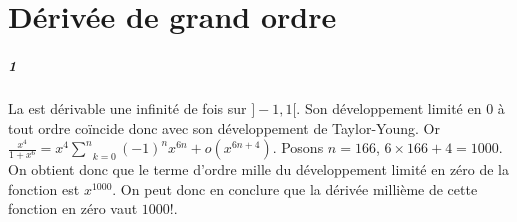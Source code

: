 \documentclass[10pt,a4paper]{article}
\newcommand{\summ}[2]{\underset{#1}{\overset{#2}{\sum}}}
\begin{document}
\section{Dérivée de grand ordre}
\subparagraph{1}La est dérivable une infinité de fois sur $]-1,1[$. Son développement limité en $0$ à tout ordre coïncide donc avec son développement de Taylor-Young. Or $\frac{x^4}{1+x^6} = x^4\summ{k=0}{n}(-1)^{n}x^{6n} + o(x^{6n+4})$. Posons $n=166$, $6 \times 166 +4 = 1000$. On obtient donc que le terme d'ordre mille du développement limité en zéro de la fonction est $x^1000$. On peut donc en conclure que la dérivée millième de cette fonction en zéro vaut $1000!$.
\end{document}
